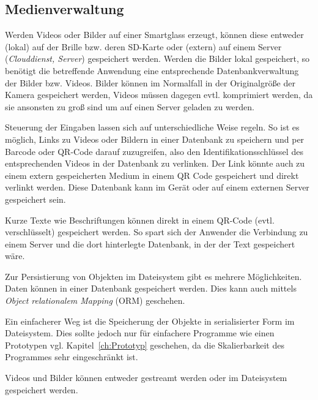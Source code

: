 \subsection{Medienverwaltung}
\label{sec:Medienverwaltung}
Werden Videos oder Bilder auf einer Smartglass erzeugt, können diese entweder (lokal) auf der Brille bzw. deren SD-Karte oder (extern) auf einem Server (\emph{Clouddienst, Server}) gespeichert werden. Werden die Bilder lokal gespeichert, so benötigt die betreffende Anwendung eine entsprechende Datenbankverwaltung der Bilder bzw. Videos. Bilder können im Normalfall in der Originalgröße der Kamera gespeichert werden, Videos müssen dagegen evtl. komprimiert werden, da sie ansonsten zu groß sind um auf einen Server geladen zu werden. 

Steuerung der Eingaben lassen sich auf unterschiedliche Weise regeln. So ist es möglich, Links zu Videos oder Bildern in einer Datenbank zu speichern und per Barcode oder QR-Code darauf zuzugreifen, also den Identifikationsschlüssel des entsprechenden Videos in der Datenbank zu verlinken. Der Link könnte auch zu einem extern gespeicherten Medium in einem QR Code gespeichert und direkt verlinkt werden. Diese Datenbank kann im Gerät oder auf einem externen Server gespeichert sein. 
%

Kurze Texte wie Beschriftungen können direkt in einem QR-Code (evtl. verschlüsselt) gespeichert werden. So spart sich der Anwender die Verbindung zu einem Server und die dort hinterlegte Datenbank, in der der Text gespeichert wäre.

Zur Persistierung von Objekten im Dateisystem gibt es mehrere Möglichkeiten. Daten können in einer Datenbank gespeichert werden. Dies kann auch mittels \emph{Object relationalem Mapping} (ORM) geschehen.

Ein einfacherer Weg ist die Speicherung der Objekte in serialisierter Form im Dateisystem. Dies sollte jedoch nur für einfachere Programme wie einen Prototypen vgl. Kapitel~\ref{ch:Prototyp} geschehen, da die Skalierbarkeit des Programmes sehr eingeschränkt ist.

Videos und Bilder können entweder gestreamt werden oder im Dateisystem gespeichert werden.
%
%
%
%
%
%
